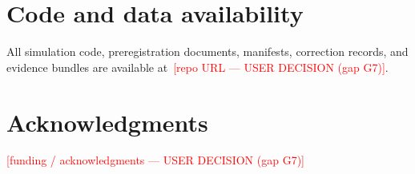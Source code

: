 \documentclass[10pt,twocolumn]{article}
\newcommand{\SPH}[1]{\textcolor{red}{[#1]}}
\newcommand{\CITE}[1]{\textsuperscript{\textcolor{gray}{\scriptsize[#1]}}}
\begin{document}
\section*{Code and data availability}
All simulation code, preregistration documents, manifests, correction records,
and evidence bundles are available at~\SPH{repo URL --- USER DECISION (gap G7)}.

\section*{Acknowledgments}
\SPH{funding / acknowledgments --- USER DECISION (gap G7)}

% 
% 
\end{document}
